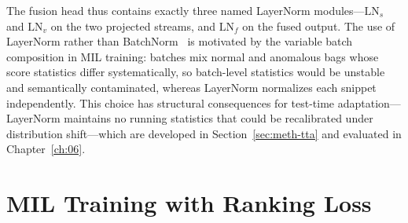 The fusion head thus contains exactly three named LayerNorm modules---$\text{LN}_s$ and
$\text{LN}_v$ on the two projected streams, and $\text{LN}_f$ on the fused output. The use of
LayerNorm rather than BatchNorm~\cite{ioffe2015batchnorm} is motivated by the variable batch
composition in MIL training: batches mix normal and anomalous bags whose score statistics differ
systematically, so batch-level statistics would be unstable and semantically contaminated,
whereas LayerNorm normalizes each snippet independently. This choice has structural consequences
for test-time adaptation---LayerNorm maintains no running statistics that could be recalibrated
under distribution shift---which are developed in Section~\ref{sec:meth-tta} and evaluated in
Chapter~\ref{ch:06}.

\section{MIL Training with Ranking Loss}
\label{sec:meth-mil}

